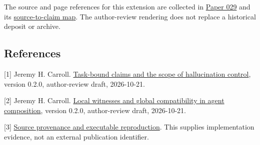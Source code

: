 \documentclass[
  11pt,
]{article}
\begin{document}
The source and page references for this extension are collected in
\href{../029/paper.pdf}{Paper 029} and its
\href{../029/docs/source_to_claim_map.md}{source-to-claim map}. The
author-review rendering does not replace a historical deposit or
archive.

\subsection{References}\label{references}

{[}1{]} Jeremy H. Carroll. \href{../023/paper.pdf}{Task-bound claims and
the scope of hallucination control}, version 0.2.0, author-review draft,
2026-10-21.

{[}2{]} Jeremy H. Carroll. \href{../025/paper.pdf}{Local witnesses and
global compatibility in agent composition}, version 0.2.0, author-review
draft, 2026-10-21.

{[}3{]} \href{docs/reproduction.md}{Source provenance and executable
reproduction}. This supplies implementation evidence, not an external
publication identifier.
\end{document}
